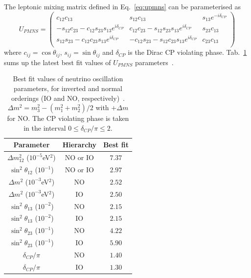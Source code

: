 The leptonic mixing matrix defined in Eq.~\eqref{eq:upmns} can be parameterised as
\begin{equation}
  U_{PMNS}=
  \begin{pmatrix}
    c_{12}c_{13} & s_{12}c_{13} & s_{13}e^{-i\delta_{CP}} \\
    -s_{12}c_{23}-c_{12}s_{23}s_{13}e^{i\delta_{CP}} & c_{12}c_{23}-s_{12}s_{23}s_{13}e^{i\delta_{CP}} & s_{23}c_{13} \\
    s_{12}s_{23}-c_{12}c_{23}s_{13}e^{i\delta_{CP}} &  -c_{12}s_{23}-s_{12}c_{23}s_{13}e^{i\delta_{CP}} &  c_{23}c_{13} \\
  \end{pmatrix}
  \label{eq:upmns_detail}
\end{equation}
where $c_{ij}=\cos{\theta_{ij}}$, $s_{ij}=\sin{\theta_{ij}}$ and $\delta_{CP}$ is the Dirac CP violating phase.
Tab.~\ref{tab:best_fit} sums up the latest best fit values of $U_{PMNS}$ parameters~\cite{art:Capozzi_2017}.
\begin{table}[h]
  \centering
  \begin{tabular}{|c|c|c|}
    \hline
    Parameter & Hierarchy & Best fit \\
    \hline\hline
    $\Delta m^{2}_{12}$ ($10^{-5}$eV$^{2}$) & NO or IO & $7.37$ \\
    \hline
    $\sin^{2}\theta_{12}$ ($10^{-1}$) & NO or IO & $2.97$ \\
    \hline
    $\Delta m^2$ ($10^{-3}$eV$^{2}$) & NO & $2.52$ \\
    $\Delta m^2$ ($10^{-3}$eV$^{2}$) & IO & $2.50$ \\
    \hline
    $\sin^{2}\theta_{13}$ ($10^{-2}$) & NO & $2.15$ \\
    $\sin^{2}\theta_{13}$ ($10^{-2}$) & IO & $2.15$ \\
    \hline
    $\sin^{2}\theta_{23}$ ($10^{-1}$) & NO & $4.22$ \\
    $\sin^{2}\theta_{23}$ ($10^{-1}$) & IO & $5.90$ \\
    \hline
    $\delta_{CP}/\pi$ & NO & $1.40$ \\
    $\delta_{CP}/\pi$ & IO & $1.30$ \\
    \hline
  \end{tabular}
  \caption{Best fit values of neutrino oscillation parameters, for inverted and normal orderings (IO and NO, respectively)~\cite{art:Capozzi_2017}.
    ${\Delta m^{2}=m_3^2-(m_1^2+m_2^2)/2}$ with $+\Delta m$ for NO.
    The CP violating phase is taken in the interval $0\leq\delta_{CP}/\pi\leq2$.
    \label{tab:best_fit}}
\end{table}

